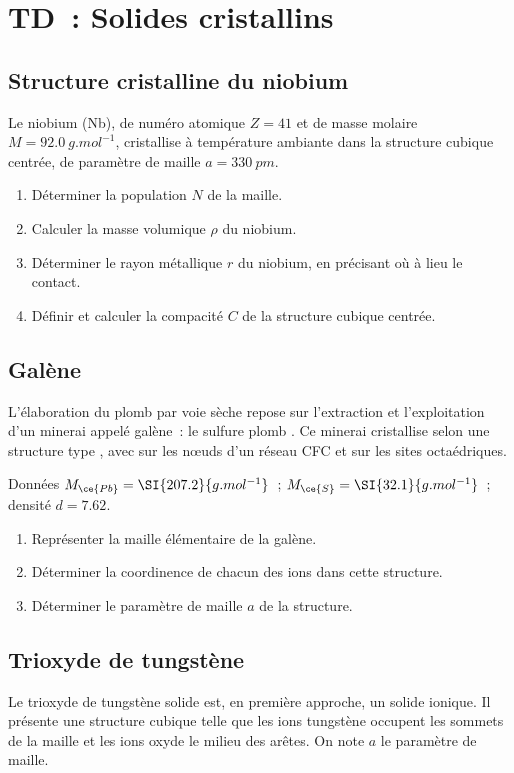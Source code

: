\documentclass[a4paper, 10pt, final, garamond]{book}
\begin{document}
\setcounter{chapter}{2}

\chapter{TD~: Solides cristallins}

\section{Structure cristalline du niobium}
Le niobium (Nb), de numéro atomique $Z = 41$ et de masse molaire $M =
\SI{92.0}{g.mol^{-1}}$, cristallise à température ambiante dans la structure
cubique centrée, de paramètre de maille $a = \SI{330}{pm}$.
\begin{enumerate}
  \item Déterminer la population $N$ de la maille.
  \item Calculer la masse volumique $\rho$ du niobium.
  \item Déterminer le rayon métallique $r$ du niobium, en précisant où à lieu le
    contact.
  \item Définir et calculer la compacité $C$ de la structure cubique centrée.
\end{enumerate}

\section{Galène}
L'élaboration du plomb par voie sèche repose sur l'extraction et l'exploitation
d'un minerai appelé galène~: le sulfure plomb . Ce minerai cristallise
selon une structure type , avec  sur les nœuds d'un réseau
CFC et  sur les sites octaédriques.
\begin{rdefi}{Données}
  $M_{\ce{Pb}} = \SI{207.2}{g.mol^{-1}}$~; $M_{\ce{S}} =
  \SI{32.1}{g.mol^{-1}}$~; densité $d = \num{7.62}$.
\end{rdefi}
\begin{enumerate}
  \item Représenter la maille élémentaire de la galène.
  \item Déterminer la coordinence de chacun des ions dans cette structure.
  \item Déterminer le paramètre de maille $a$ de la structure.
\end{enumerate}

\section{Trioxyde de tungstène}
Le trioxyde de tungstène  solide est, en première approche, un solide
ionique. Il présente une structure cubique telle que les ions tungstène
 occupent les sommets de la maille et les ions oxyde  le
milieu des arêtes. On note $a$ le paramètre de maille.
\end{document}
